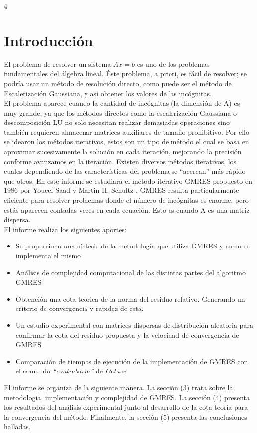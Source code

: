 \documentclass{endm}
\begin{document}
4\section{Introducci\'on}\label{intro}
El problema de resolver un sistema $Ax=b$ es uno de los problemas fundamentales del álgebra lineal. \'Este problema, a priori, es  f\'acil de resolver; se podr\'ia usar un m\'etodo de resoluci\'on directo, como puede ser el m\'etodo de Escalerizaci\'on Gaussiana, y as\'i obtener los valores de las inc\'ognitas.\\

El problema aparece cuando la cantidad de incógnitas (la dimensión de A) es muy grande, ya que los métodos directos como la escalerización Gaussiana o descomposición LU no solo necesitan realizar demasiadas operaciones sino también requieren almacenar matrices auxiliares de tamaño prohibitivo. Por ello se idearon los métodos iterativos, estos son un tipo de método el cual se basa en aproximar sucesivamente la solución en cada iteración, mejorando la precisión conforme avanzamos en la iteración. Existen diversos métodos iterativos, los cuales dependiendo de las características del problema se “acercan” más rápido que otros. En este informe se estudiará el método iterativo GMRES propuesto en 1986 por Youcef Saad y Martin H. Schultz \cite{GMRES} . GMRES resulta particularmente eficiente para resolver problemas donde el número de incógnitas es enorme, pero estás aparecen contadas veces en cada ecuación. Esto es cuando A es una matriz dispersa.\\

El informe realiza los siguientes aportes:
\begin{itemize}
    \item Se proporciona una síntesis de la metodología que utiliza GMRES y como se implementa el mismo
    \item  Análisis de complejidad computacional de las distintas partes del algoritmo GMRES
    \item Obtención una cota teórica de la norma del residuo relativo. Generando un criterio de convergencia y rapidez de esta.
    \item Un estudio experimental con matrices dispersas de distribución aleatoria para confirmar la cota del residuo propuesta y la velocidad de convergencia de GMRES
    \item Comparación de tiempos de ejecución de la implementación de GMRES con el comando \textit{“contrabarra”} de \textit{Octave}
\end{itemize}
El informe se organiza de la siguiente manera. La sección (3) trata sobre la metodología, implementación y complejidad de GMRES. La sección (4) presenta los resultados del análisis experimental junto al desarrollo de la cota teoría para la convergencia del método. Finalmente, la sección (5) presenta las conclusiones halladas.  
\end{document}
